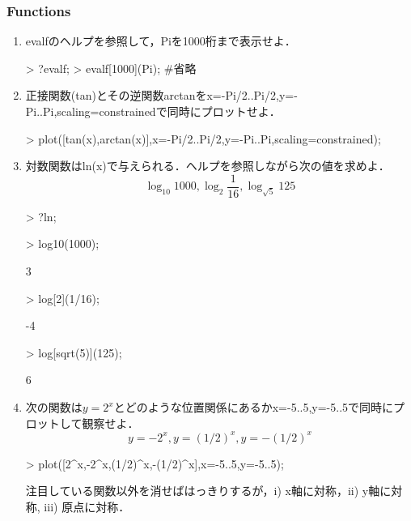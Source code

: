 \subsubsection{Functions}
\begin{enumerate}
\item evalfのヘルプを参照して，Piを1000桁まで表示せよ．
\begin{MapleInput}
> ?evalf;
> evalf[1000](Pi);      #省略
\end{MapleInput}

\item 正接関数(tan)とその逆関数arctanをx=-Pi/2..Pi/2,y=-Pi..Pi,scaling=constrainedで同時にプロットせよ．
\begin{MapleInput}
> plot([tan(x),arctan(x)],x=-Pi/2..Pi/2,y=-Pi..Pi,scaling=constrained);
\end{MapleInput}

\item 対数関数はln(x)で与えられる．ヘルプを参照しながら次の値を求めよ．
\begin{equation*}
\log_{10}1000, \log_{2}\frac{1}{16}, \log_{\sqrt{5}}125
\end{equation*}

\begin{MapleInput}
> ?ln;
\end{MapleInput}

\begin{MapleInput}
> log10(1000);
\end{MapleInput}
\begin{MapleOutput}
3
\end{MapleOutput}
\begin{MapleInput}
> log[2](1/16);
\end{MapleInput}
\begin{MapleOutput}
-4
\end{MapleOutput}
\begin{MapleInput}
> log[sqrt(5)](125);
\end{MapleInput}
\begin{MapleOutput}
6
\end{MapleOutput}

\item 次の関数は$y=2^x$とどのような位置関係にあるかx=-5..5,y=-5..5で同時にプロットして観察せよ．
\begin{equation*}
y = -2^x, y = (1/2)^x,y = -(1/2)^x
\end{equation*}
\begin{MapleInput}
> plot([2^x,-2^x,(1/2)^x,-(1/2)^x],x=-5..5,y=-5..5);
\end{MapleInput}
注目している関数以外を消せばはっきりするが，i) x軸に対称，ii) y軸に対称, iii) 原点に対称．


\end{enumerate}
